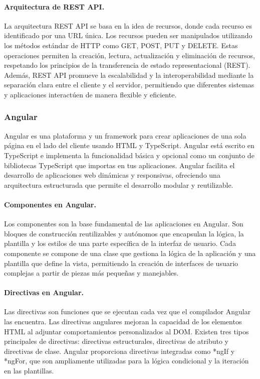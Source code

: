 \paragraph{Arquitectura de REST API.}
La arquitectura REST API se basa en la idea de recursos, donde cada recurso es identificado por una URL única. Los recursos pueden ser manipulados utilizando los métodos estándar de HTTP como GET, POST, PUT y DELETE. Estas operaciones permiten la creación, lectura, actualización y eliminación de recursos, respetando los principios de la transferencia de estado representacional (REST). Además, REST API promueve la escalabilidad y la interoperabilidad mediante la separación clara entre el cliente y el servidor, permitiendo que diferentes sistemas y aplicaciones interactúen de manera flexible y eficiente.

\subsubsection{Angular}
Angular es una plataforma y un framework para crear aplicaciones de una sola página en el lado del cliente usando HTML y TypeScript. Angular está escrito en TypeScript e implementa la funcionalidad básica y opcional como un conjunto de bibliotecas TypeScript que importas en tus aplicaciones. Angular facilita el desarrollo de aplicaciones web dinámicas y responsivas, ofreciendo una arquitectura estructurada que permite el desarrollo modular y reutilizable.

\paragraph{Componentes en Angular.}
Los componentes son la base fundamental de las aplicaciones en Angular. Son bloques de construcción reutilizables y autónomos que encapsulan la lógica, la plantilla y los estilos de una parte específica de la interfaz de usuario. Cada componente se compone de una clase que gestiona la lógica de la aplicación y una plantilla que define la vista, permitiendo la creación de interfaces de usuario complejas a partir de piezas más pequeñas y manejables.

\paragraph{Directivas en Angular.}
Las directivas son funciones que se ejecutan cada vez que el compilador Angular las encuentra. Las directivas angulares mejoran la capacidad de los elementos HTML al adjuntar comportamientos personalizados al DOM. Existen tres tipos principales de directivas: directivas estructurales, directivas de atributo y directivas de clase. Angular proporciona directivas integradas como *ngIf y *ngFor, que son ampliamente utilizadas para la lógica condicional y la iteración en las plantillas.



